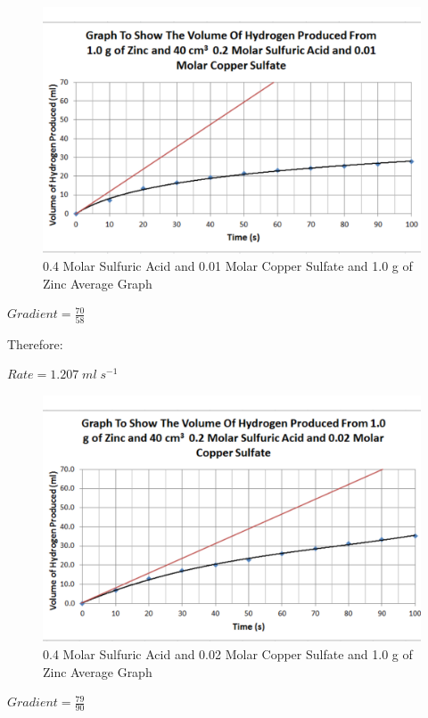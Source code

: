 \begin{figure}[H]
    \includegraphics[width=\textwidth]{./Analysis/Images/3VaryCopperSulfate/001Molar.pdf}
    \caption{0.4 Molar Sulfuric Acid and 0.01 Molar Copper Sulfate and 1.0 g of Zinc Average Graph} \label{fig:001VaryCopperSulfate}
\end{figure}

$Gradient = \frac{70}{58}$

Therefore:

$Rate = 1.207 \; ml \; s^{-1}$

\begin{figure}[H]
    \includegraphics[width=\textwidth]{./Analysis/Images/3VaryCopperSulfate/002Molar.pdf}
    \caption{0.4 Molar Sulfuric Acid and 0.02 Molar Copper Sulfate and 1.0 g of Zinc Average Graph} \label{fig:002VaryCopperSulfate}
\end{figure}

$Gradient = \frac{79}{90}$

